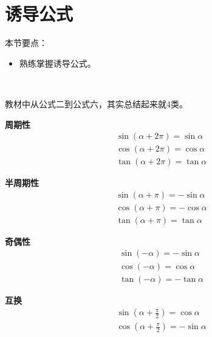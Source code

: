 \section{诱导公式}

本节要点：
\begin{itemize}
    \item 熟练掌握诱导公式。
\end{itemize}

~

教材中从公式二到公式六，其实总结起来就4类。

{\bf 周期性}
\begin{align*}
&\sin \left( \alpha +2\pi \right) =\sin \alpha \\
&\cos \left( \alpha +2\pi \right) =\cos \alpha \\
&\tan \left( \alpha +2\pi \right) =\tan \alpha
\end{align*}

{\bf 半周期性}
\begin{align*}
&\sin \left( \alpha +\pi \right) =-\sin \alpha \\
&\cos \left( \alpha +\pi \right) =-\cos \alpha \\
&\tan \left( \alpha +\pi \right) =\tan \alpha
\end{align*}

{\bf 奇偶性}
\begin{align*}
&\sin \left( -\alpha \right) =-\sin \alpha \\
&\cos \left( -\alpha \right) =\cos \alpha \\
&\tan \left( -\alpha \right) =-\tan \alpha
\end{align*}

{\bf 互换}
\begin{align*}
&\sin \left( \alpha +\frac{\pi}{2} \right) =\cos \alpha \\
&\cos \left( \alpha +\frac{\pi}{2} \right) =-\sin \alpha
\end{align*}




